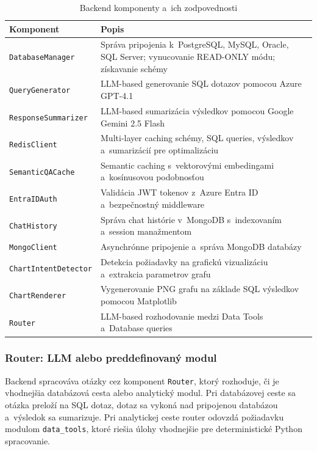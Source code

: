\documentclass[a4paper, 12pt]{article}
\begin{document}
\begin{table}[H]
\centering
\small
\begin{tabular}{lp{9cm}}
\toprule
\textbf{Komponent} & \textbf{Popis} \\
\midrule
\texttt{DatabaseManager} & Správa pripojenia k~PostgreSQL, MySQL, Oracle, SQL Server; vynucovanie READ-ONLY módu; získavanie schémy \\
\texttt{QueryGenerator} & LLM-based generovanie SQL dotazov pomocou Azure GPT-4.1 \\
\texttt{ResponseSummarizer} & LLM-based sumarizácia výsledkov pomocou Google Gemini 2.5 Flash \\
\texttt{RedisClient} & Multi-layer caching schémy, SQL queries, výsledkov a~sumarizácií pre optimalizáciu \\
\texttt{SemanticQACache} & Semantic caching s~vektorovými embedingami a~kosínusovou podobnosťou \\
\texttt{EntraIDAuth} & Validácia JWT tokenov z~Azure Entra ID a~bezpečnostný middleware \\
\texttt{ChatHistory} & Správa chat histórie v~MongoDB s~indexovaním a~session manažmentom \\
\texttt{MongoClient} & Asynchrónne pripojenie a~správa MongoDB databázy \\
\texttt{ChartIntentDetector} & Detekcia požiadavky na grafickú vizualizáciu a~extrakcia parametrov grafu \\
\texttt{ChartRenderer} & Vygenerovanie PNG grafu na základe SQL výsledkov pomocou Matplotlib \\
\texttt{Router} & LLM-based rozhodovanie medzi Data Tools a~Database queries \\
\bottomrule
\end{tabular}
\caption{Backend komponenty a~ich zodpovednosti}
\end{table}

\subsubsection{Router: LLM alebo preddefinovaný modul}

Backend spracováva otázky cez komponent \texttt{Router}, ktorý rozhoduje, či je vhodnejšia databázová cesta alebo analytický modul. Pri databázovej ceste sa otázka preloží na SQL dotaz, dotaz sa vykoná nad pripojenou databázou a~výsledok sa sumarizuje. Pri analytickej ceste router odovzdá požiadavku modulom \texttt{data\_tools}, ktoré riešia úlohy vhodnejšie pre deterministické Python spracovanie.
\end{document}
